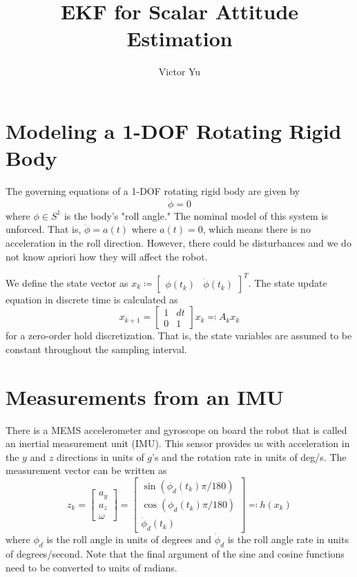 \documentclass{article}
\title{EKF for Scalar Attitude Estimation}
\author{Victor Yu}
\begin{document}
	\maketitle
	
	\section{Modeling a 1-DOF Rotating Rigid Body}
	
	The governing equations of a 1-DOF rotating rigid body are given by
	\begin{equation}
		\ddot{\phi} = 0
	\end{equation}
	where $\phi \in S^1$ is the body's "roll angle." The nominal model of this system is unforced. That is, $\ddot{\phi} = a(t)$ where $a(t) = 0$, which means there is no acceleration in the roll direction. However, there could be disturbances and we do not know apriori how they will affect the robot.
	
	We define the state vector as $x_k \coloneqq \left[ \begin{smallmatrix} \phi(t_k)&\dot{\phi}(t_k) \end{smallmatrix} \right]^T$. The state update equation in discrete time is calculated as
	\begin{equation} \label{eq:state_update}
		x_{k+1} = 
		\begin{bmatrix}
		1 & dt\\
		0 & 1
		\end{bmatrix}
		x_k \eqqcolon A_kx_k
	\end{equation}
	for a zero-order hold discretization. That is, the state variables are assumed to be constant throughout the sampling interval.
	
	\section{Measurements from an IMU}
	There is a MEMS accelerometer and gyroscope on board the robot that is called an inertial measurement unit (IMU). This sensor provides us with acceleration in the $y$ and $z$ directions in units of $g$'s and the rotation rate in units of deg/s. The measurement vector can be written as
	\begin{equation} \label{eq:measurement}
		z_k = 
		\begin{bmatrix}
		a_y\\
		a_z\\
		\omega
		\end{bmatrix}
		=
		\begin{bmatrix}
		\sin(\phi_d(t_k)\pi/180)\\
		\cos(\phi_d(t_k)\pi/180)\\
		\dot{\phi}_d(t_k)
		\end{bmatrix}
		\eqqcolon h(x_k)
	\end{equation}
	where $\phi_d$ is the roll angle in units of degrees and $\dot{\phi}_d$ is the roll angle rate in units of degrees/second. Note that the final argument of the sine and cosine functions need to be converted to units of radians.
	
\end{document}
